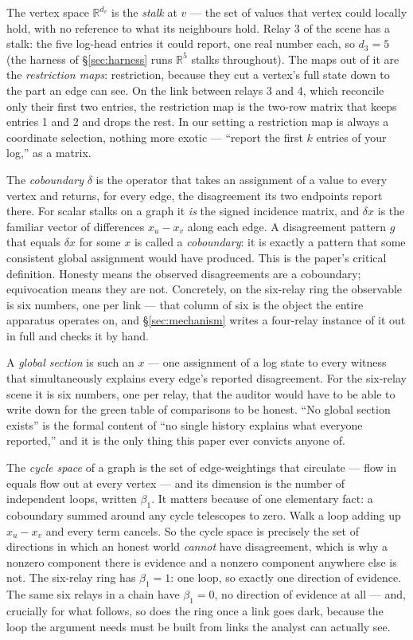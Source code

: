 \documentclass[11pt,a4paper]{article}
\begin{document}
The vertex space $\mathbb{R}^{d_v}$ is the \emph{stalk} at $v$ --- the set of values that vertex could locally hold, with no
reference to what its neighbours hold. Relay 3 of the scene has a stalk: the five log-head entries it could report, one real
number each, so $d_3=5$ (the harness of \S\ref{sec:harness} runs $\mathbb{R}^5$ stalks throughout). The maps out of it are
the \emph{restriction maps}: restriction, because they cut a vertex's full state down to the part an edge can see. On the
link between relays 3 and 4, which reconcile only their first two entries, the restriction map is the two-row matrix that
keeps entries 1 and 2 and drops the rest. In our setting a restriction map is always a coordinate selection, nothing more
exotic --- ``report the first $k$ entries of your log,'' as a matrix.

The \emph{coboundary} $\delta$ is the operator that takes an assignment of a value to every vertex and returns, for every
edge, the disagreement its two endpoints report there. For scalar stalks on a graph it \emph{is} the signed incidence
matrix, and $\delta x$ is the familiar vector of differences $x_u - x_v$ along each edge. A disagreement pattern $g$ that
equals $\delta x$ for some $x$ is called a \emph{coboundary}: it is exactly a pattern that some consistent global assignment
would have produced. This is the paper's critical definition. Honesty means the observed disagreements are a
coboundary; equivocation means they are not. Concretely, on the six-relay ring the observable is six numbers, one per link
--- that column of six is the object the entire apparatus operates on, and \S\ref{sec:mechanism} writes a four-relay
instance of it out in full and checks it by hand.

A \emph{global section} is such an $x$ --- one assignment of a log state to every witness that simultaneously explains every
edge's reported disagreement. For the six-relay scene it is six numbers, one per relay, that the auditor would have to be
able to write down for the green table of comparisons to be honest. ``No global section exists'' is the formal content of
``no single history explains what everyone reported,'' and it is the only thing this paper ever convicts anyone of.

The \emph{cycle space} of a graph is the set of edge-weightings that circulate --- flow in equals flow out at every vertex
--- and its dimension is the number of independent loops, written $\beta_1$. It matters because of one elementary fact: a
coboundary summed around any cycle telescopes to zero. Walk a loop adding up $x_u - x_v$ and every term cancels. So the
cycle space is precisely the set of directions in which an honest world \emph{cannot} have disagreement, which is why a
nonzero component there is evidence and a nonzero component anywhere else is not. The six-relay ring has $\beta_1=1$: one
loop, so exactly one direction of evidence. The same six relays in a chain have $\beta_1=0$, no direction of evidence at
all --- and, crucially for what follows, so does the ring once a link goes dark, because the loop the argument needs must be
built from links the analyst can actually see.
\end{document}
